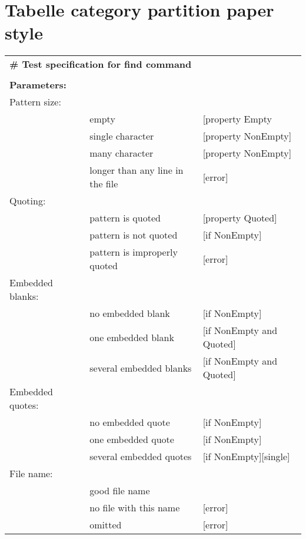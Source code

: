 \clearpage
		
\section{Tabelle category partition paper style}

\begin{tabular}{lll}
\multicolumn{3}{l}{ \textbf{\# Test specification for find command} }								\\
\multicolumn{3}{l}{ }																				\\
\textbf{Parameters:}	& 										&									\\
Pattern size:			&										&									\\
						&	empty								&	[property Empty					\\
						&	single character					&	[property NonEmpty]				\\
						&	many character						&	[property NonEmpty]				\\
						&	longer than any line in the file	&	[error]							\\
Quoting:				&										&									\\
						&	pattern is quoted					&	[property Quoted]				\\
						&	pattern is not quoted				&	[if NonEmpty]					\\
						&	pattern is improperly quoted		&	[error]							\\
Embedded blanks:		&										&									\\
						&	no embedded blank					&	[if NonEmpty]					\\
						&	one embedded blank					&	[if NonEmpty and Quoted]		\\
						&	several embedded blanks				&	[if NonEmpty and Quoted]		\\
Embedded quotes:		&										&									\\
						&	no embedded quote					&	[if NonEmpty]					\\
						&	one embedded quote					&	[if NonEmpty]					\\
						&	several embedded quotes				&	[if NonEmpty][single]			\\
File name:				&										&									\\
						&	good file name						&									\\
						&	no file with this name				&	[error]							\\
						&	omitted								&	[error]							\\
\end{tabular}

